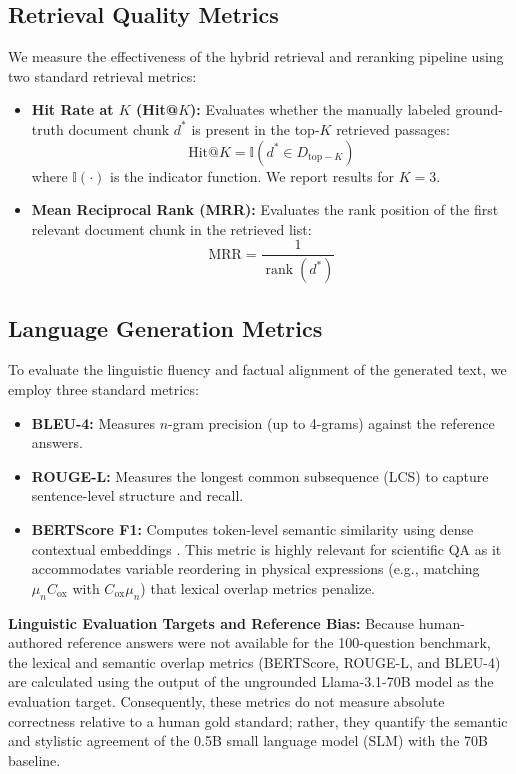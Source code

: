 \documentclass[a4paper,fleqn]{cas-sc}
\begin{document}
\subsection{Retrieval Quality Metrics}
We measure the effectiveness of the hybrid retrieval and reranking pipeline using two standard retrieval metrics:
\begin{itemize}
    \item \textbf{Hit Rate at $K$ (Hit@$K$):} Evaluates whether the manually labeled ground-truth document chunk $d^*$ is present in the top-$K$ retrieved passages:
    \begin{equation*}
        \mathrm{Hit@}K = \mathbb{I}\left( d^* \in D_{\mathrm{top-}K} \right)
    \end{equation*}
    where $\mathbb{I}(\cdot)$ is the indicator function. We report results for $K=3$.
    \item \textbf{Mean Reciprocal Rank (MRR):} Evaluates the rank position of the first relevant document chunk in the retrieved list:
    \begin{equation*}
        \mathrm{MRR} = \frac{1}{\operatorname{rank}(d^*)}
    \end{equation*}
\end{itemize}

\subsection{Language Generation Metrics}
To evaluate the linguistic fluency and factual alignment of the generated text, we employ three standard metrics:
\begin{itemize}
    \item \textbf{BLEU-4:} Measures $n$-gram precision (up to 4-grams) against the reference answers.
    \item \textbf{ROUGE-L:} Measures the longest common subsequence (LCS) to capture sentence-level structure and recall.
    \item \textbf{BERTScore F1:} Computes token-level semantic similarity using dense contextual embeddings \citep{bert-score}. This metric is highly relevant for scientific QA as it accommodates variable reordering in physical expressions (e.g., matching $\mu_n C_{\text{ox}}$ with $C_{\text{ox}} \mu_n$) that lexical overlap metrics penalize.
\end{itemize}

\noindent \textbf{Linguistic Evaluation Targets and Reference Bias:} Because human-authored reference answers were not available for the 100-question benchmark, the lexical and semantic overlap metrics (BERTScore, ROUGE-L, and BLEU-4) are calculated using the output of the ungrounded Llama-3.1-70B model as the evaluation target. Consequently, these metrics do not measure absolute correctness relative to a human gold standard; rather, they quantify the semantic and stylistic agreement of the 0.5B small language model (SLM) with the 70B baseline.
\end{document}
